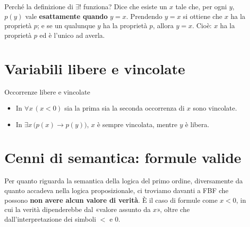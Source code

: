 Perché la definizione di $\exists!$ funziona? Dice che esiste un $x$ tale che, per ogni $y$, $p(y)$ vale
\textbf{esattamente quando} $y = x$. Prendendo $y = x$ si ottiene che $x$ ha la proprietà $p$; e se un qualunque
$y$ ha la proprietà $p$, allora $y = x$. Cioè: $x$ ha la proprietà $p$ ed è l'unico ad averla.


\section{Variabili libere e vincolate}\label{sec:libere}


\begin{esempio}{Occorrenze libere e vincolate}
    \begin{itemize}
        \item In $\forall x\,(x < 0)$ sia la prima sia la seconda occorrenza di $x$ sono vincolate.
        \item In $\exists x\,\big(p(x) \rightarrow p(y)\big)$, $x$ è sempre vincolata, mentre $y$ è libera.
    \end{itemize}
\end{esempio}


\section{Cenni di semantica: formule valide}\label{sec:valide}

Per quanto riguarda la semantica della logica del primo ordine, diversamente da quanto accadeva nella logica
proposizionale, ci troviamo davanti a FBF che possono \textbf{non avere alcun valore di verità}.
È il caso di formule come $x < 0$, in cui la verità dipenderebbe dal «valore assunto da $x$», oltre che
dall'interpretazione dei simboli $<$ e $0$.

